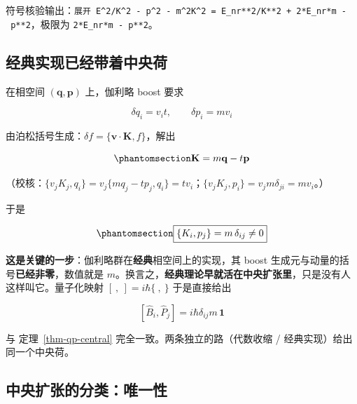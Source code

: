 \documentclass[
  chinese,
  a4paper,
  UTF8,
  12pt,
  oneside,
  openany]{ctexbook}
\theoremstyle{plain}
\theoremstyle{plain}
\theoremstyle{plain}
\theoremstyle{definition}
\theoremstyle{plain}
\theoremstyle{plain}
\theoremstyle{remark}
\begin{document}
符号核验输出：\texttt{展开\ E\^{}2/K\^{}2\ -\ p\^{}2\ -\ m\^{}2K\^{}2\ =\ E\_nr**2/K**2\ +\ 2*E\_nr*m\ -\ p**2}，极限为
\texttt{2*E\_nr*m\ -\ p**2}。

\subsection{经典实现已经带着中央荷}\label{ux7ecfux5178ux5b9eux73b0ux5df2ux7ecfux5e26ux7740ux4e2dux592eux8377}

在相空间 \((\mathbf q,\mathbf p)\) 上，伽利略 boost 要求

\[
\delta q_i=v_i t,\qquad \delta p_i=m v_i
\]

由泊松括号生成：\(\delta f=\{\mathbf v\cdot\mathbf K,f\}\)，解出

\begin{equation}\protect\phantomsection\label{eq-qp-Kclass}{
\mathbf K=m\mathbf q-t\mathbf p
}\end{equation}

（校核：\(\{v_jK_j,q_i\}=v_j\{mq_j-tp_j,q_i\}=tv_i\)；\(\{v_jK_j,p_i\}=v_j m\delta_{ji}=mv_i\)。）

于是

\begin{equation}\protect\phantomsection\label{eq-qp-poisson}{
\boxed{\{K_i,p_j\}=m\,\delta_{ij}\neq0}
}\end{equation}

\textbf{这是关键的一步}：伽利略群在\textbf{经典}相空间上的实现，其 boost
生成元与动量的括号\textbf{已经非零}，数值就是
\(m\)。换言之，\textbf{经典理论早就活在中央扩张里}，只是没有人这样叫它。量子化映射
\([\ ,\ ]=i\hbar\{\ ,\ \}\) 于是直接给出

\[
[\hat B_i,\hat P_j]=i\hbar\delta_{ij}m\,\mathbf 1
\]

与 定理~\ref{thm-qp-central} 完全一致。两条独立的路（代数收缩 /
经典实现）给出同一个中央荷。

\subsection{中央扩张的分类：唯一性}\label{ux4e2dux592eux6269ux5f20ux7684ux5206ux7c7bux552fux4e00ux6027}
\end{document}
